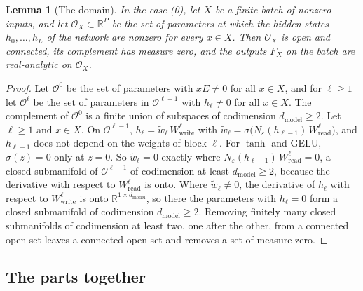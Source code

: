 \documentclass[10pt]{article}
\newtheorem{lemma}[theorem]{Lemma}
\theoremstyle{definition}
\theoremstyle{remark}
\newcommand{\R}{\mathbb{R}}
\newcommand{\Wread}{W_{\mathrm{read}}}
\newcommand{\Wwrite}{W_{\mathrm{write}}}
\newcommand{\dm}{d_{\mathrm{model}}}
\begin{document}
\begin{lemma}[The domain]\label{lem:e0domain}
In the case (0), let $X$ be a finite batch of nonzero inputs, and let $\mathcal O_X \subset \R^P$ be the set of parameters at which the hidden states $h_0, \dots, h_L$ of the network are nonzero for every $x \in X$. Then $\mathcal O_X$ is open and connected, its complement has measure zero, and the outputs $F_X$ on the batch are real-analytic on $\mathcal O_X$.
\end{lemma}

\begin{proof}
Let $\mathcal O^0$ be the set of parameters with $xE \neq 0$ for all $x \in X$, and for $\ell \ge 1$ let $\mathcal O^\ell$ be the set of parameters in $\mathcal O^{\ell-1}$ with $h_\ell \neq 0$ for all $x \in X$. The complement of $\mathcal O^0$ is a finite union of subspaces of codimension $\dm \ge 2$. Let $\ell \ge 1$ and $x \in X$. On $\mathcal O^{\ell-1}$, $h_\ell = \tilde w_\ell\,\Wwrite^{\ell}$ with $\tilde w_\ell = \sigma\big(N_\varepsilon(h_{\ell-1})\,\Wread^{\ell}\big)$, and $h_{\ell-1}$ does not depend on the weights of block $\ell$. For $\tanh$ and GELU, $\sigma(z) = 0$ only at $z = 0$. So $\tilde w_\ell = 0$ exactly where $N_\varepsilon(h_{\ell-1})\,\Wread^{\ell} = 0$, a closed submanifold of $\mathcal O^{\ell-1}$ of codimension at least $\dm \ge 2$, because the derivative with respect to $\Wread^{\ell}$ is onto. Where $\tilde w_\ell \neq 0$, the derivative of $h_\ell$ with respect to $\Wwrite^{\ell}$ is onto $\R^{1\times\dm}$, so there the parameters with $h_\ell = 0$ form a closed submanifold of codimension $\dm \ge 2$. Removing finitely many closed submanifolds of codimension at least two, one after the other, from a connected open set leaves a connected open set and removes a set of measure zero.
\end{proof}

\subsection{The parts together}\label{app:proofmain}
\end{document}
